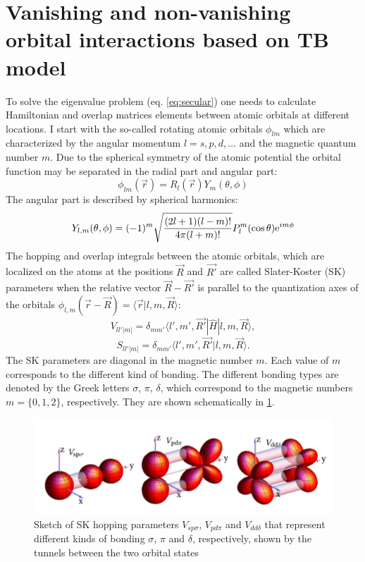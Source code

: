 \section{Vanishing and non-vanishing orbital interactions based on TB model}
To solve the eigenvalue problem (eq. \ref{eq:secular}) one needs to calculate Hamiltonian and overlap matrices elements between atomic orbitals at different locations. I start with the so-called rotating atomic orbitals $\phi_{lm}$ which are characterized by the angular momentum $l = {s, p, d, ...}$ and the magnetic quantum number $m$. Due to the spherical symmetry of the atomic potential the orbital function may be separated in the radial part and angular part:
\begin{equation}
	\phi_{lm}(\vec{r}) = R_l(\vec{r}) Y_m(\theta, \phi)
\end{equation}
The angular part is described by spherical harmonics:
\begin{equation}
	Y_{l,m}(\theta, \phi) = (-1)^m \sqrt{\frac{(2l + 1)(l-m)!}{4 \pi (l+m)!}} P_l^m(\cos{\theta})\mathrm{e}^{i m \phi}
\end{equation}
The hopping and overlap integrals between the atomic orbitals, which are localized on the atoms at the positions $\vec{R}$ and $\vec{R'}$ are called Slater-Koster (SK) parameters \cite{slatter} when the relative vector $\vec{R}-\vec{R'}$ is parallel to the quantization axes of the orbitals $\phi_{l,m}(\vec{r} - \vec{R}) = \langle \vec{r} | l, m, \vec{R} \rangle$: 
\begin{equation}
	V_{ll'|m|} = \delta_{mm'}\langle l', m', \vec{R'} | \hat{H} | l, m , \vec{R} \rangle, 
\end{equation}
\begin{equation}
	S_{ll'|m|} = \delta_{mm'}\langle l', m', \vec{R'} | l, m , \vec{R} \rangle.
\end{equation}
The SK parameters are diagonal in the magnetic number $m$. Each value of $m$ corresponds to the different kind of bonding. The different bonding types are denoted by the Greek letters $\sigma$, $\pi$, $\delta$, which correspond to the magnetic numbers $m = \{ 0, 1, 2 \}$, respectively. They are shown schematically in \ref{fig:orbitals}. 
\begin{figure}[hb]
  \includegraphics[width=\linewidth]{img/orbitals}
  \caption[caption]{Sketch of SK hopping parameters $V_{sp\sigma}$, $V_{pd\pi}$ and $V_{dd\delta}$ that represent different kinds of bonding $\sigma$, $\pi$ and $\delta$, respectively, shown by the tunnels between the two orbital states\footnotemark \label{fig:orbitals}}
\end{figure}

